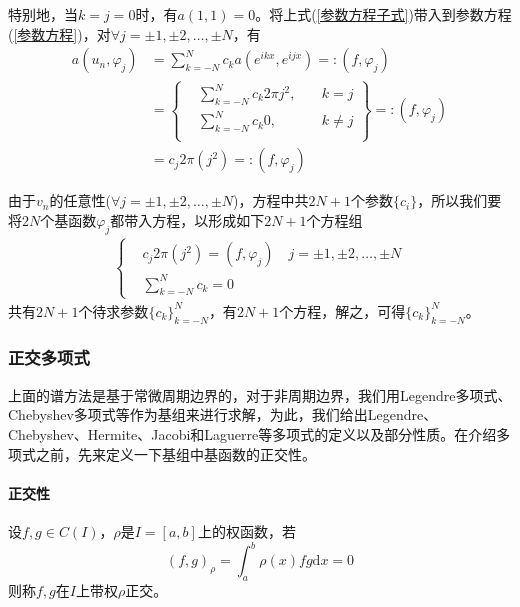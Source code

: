                 特别地，当$k = j = 0$时，有$a(1,1) = 0$。将上式(\ref{参数方程子式})带入到参数方程(\ref{参数方程})，对$\forall j = \pm 1, \pm 2,\dots,\pm N$，有
                \begin{align*}
                    a(u_n,\varphi_j)& = \sum_{k = -N}^N c_k a\left( e^{ikx},e^{ijx} \right)=: (f,\varphi_j) \\
                    &=
                    \left\{
                    \begin{aligned}
                        &\sum_{k = -N}^N c_k 2\pi j^2,&\quad k = j \\
                        &\sum_{k = -N}^N c_k 0,&\quad k \neq j \\
                    \end{aligned}
                    \right\}
                     =: (f,\varphi_j) \\
                     & = c_j2\pi(j^2) =: (f,\varphi_j)
                \end{align*}
                \par
                由于$v_n$的任意性($\forall j = \pm 1, \pm 2,\dots,\pm N$)，方程中共$2N+1$个参数$\{c_i\}$，所以我们要将$2N$个基函数$\varphi_j$都带入方程，以形成如下$2N+1$个方程组
                \begin{align*}
                    \left\{
                        \begin{aligned}
                            &c_j 2\pi(j^2) = (f,\varphi_j) \quad j = \pm 1, \pm 2,\dots,\pm N\\
                            &\sum_{k = -N}^N c_k = 0
                        \end{aligned}
                    \right.
                \end{align*}
                共有$2N+1$个待求参数$\{c_k\}_{k = -N}^N$，有$2N+1$个方程，解之，可得$\{c_k\}_{k = -N}^N$。
            \subsubsection{正交多项式}
                \label{subsubsec:正交多项式}
                \par
                上面的谱方法是基于常微周期边界的，对于非周期边界，我们用Legendre多项式、Chebyshev多项式等作为基组来进行求解，为此，我们给出Legendre、Chebyshev、Hermite、Jacobi和Laguerre等多项式的定义以及部分性质。在介绍多项式之前，先来定义一下基组中基函数的正交性。
                \paragraph{正交性}设$f,g \in C(I)$，$\rho$是$I= [a,b]$上的权函数，若
                \[
                    (f,g)_\rho = \int_a^b \rho(x)fg\mathrm{d}x = 0
                \]
                则称$f,g$在$I$上带权$\rho$正交。
